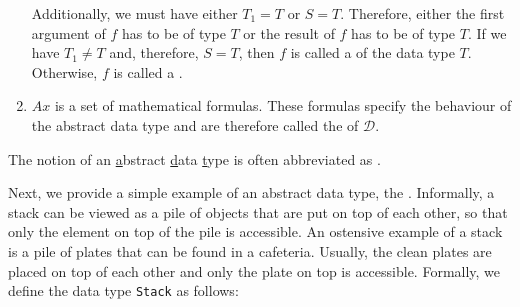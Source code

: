 \begin{enumerate}
      Additionally, we must have either $T_1 = T$ or $S = T$.  Therefore, either
      the first argument of $f$ has to be of type $T$ or the result of $f$ has to be of type 
      $T$.  If we have  $T_1 \not= T$ and, therefore, $S = T$,
      then $f$ is called a  of the data type $T$.  Otherwise,
      $f$ is called a  .
\item $Ax$ is a set of mathematical formulas.   These formulas 
      specify the behaviour of the abstract data type and are therefore called
      the  of $\mathcal{D}$.
\end{enumerate}
The notion of an \underline{a}bstract \underline{d}ata \underline{t}ype is often abbreviated as \textsc{}.

Next, we provide a simple example of an abstract data type, the .
Informally, a stack can be viewed as a pile of objects that are put on top of each other, so that
only the element on top of the pile is accessible.  An ostensive example of a stack is a pile of
plates that can be found in a cafeteria.  Usually, the clean plates are placed on top of each other
and only the plate on top is accessible.  Formally, we define the data type \texttt{Stack} as follows:
